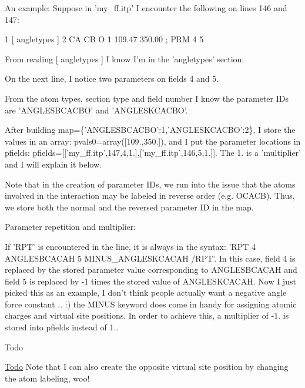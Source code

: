 An example\-: Suppose in 'my\-\_\-ff.\-itp' I encounter the following on lines 146 and 147\-:


\begin{DoxyCode}
1 [ angletypes ]
2 CA   CB   O   1   109.47  350.00  ; PRM 4 5
\end{DoxyCode}


From reading {\ttfamily \mbox{[} angletypes \mbox{]}} I know I'm in the 'angletypes' section.

On the next line, I notice two parameters on fields 4 and 5.

From the atom types, section type and field number I know the parameter I\-Ds are {\ttfamily 'A\-N\-G\-L\-E\-S\-B\-C\-A\-C\-B\-O'} and {\ttfamily 'A\-N\-G\-L\-E\-S\-K\-C\-A\-C\-B\-O'}.

After building {\ttfamily map=\{'A\-N\-G\-L\-E\-S\-B\-C\-A\-C\-B\-O'\-:1,'A\-N\-G\-L\-E\-S\-K\-C\-A\-C\-B\-O'\-:2\}}, I store the values in an array\-: {\ttfamily pvals0=array(\mbox{[}109.,350.\mbox{]})}, and I put the parameter locations in pfields\-: {\ttfamily pfields=\mbox{[}\mbox{[}'my\-\_\-ff.\-itp',147,4,1.\mbox{]},\mbox{[}'my\-\_\-ff.\-itp',146,5,1.\mbox{]}\mbox{]}}. The 1. is a 'multiplier' and I will explain it below.

Note that in the creation of parameter I\-Ds, we run into the issue that the atoms involved in the interaction may be labeled in reverse order (e.\-g. {\ttfamily O\-C\-A\-C\-B}). Thus, we store both the normal and the reversed parameter I\-D in the map.

Parameter repetition and multiplier\-:

If {\ttfamily 'R\-P\-T'} is encountered in the line, it is always in the syntax\-: {\ttfamily 'R\-P\-T 4 A\-N\-G\-L\-E\-S\-B\-C\-A\-C\-A\-H 5 M\-I\-N\-U\-S\-\_\-\-A\-N\-G\-L\-E\-S\-K\-C\-A\-C\-A\-H /\-R\-P\-T'}. In this case, field 4 is replaced by the stored parameter value corresponding to {\ttfamily A\-N\-G\-L\-E\-S\-B\-C\-A\-C\-A\-H} and field 5 is replaced by -\/1 times the stored value of {\ttfamily A\-N\-G\-L\-E\-S\-K\-C\-A\-C\-A\-H}. Now I just picked this as an example, I don't think people actually want a negative angle force constant .. \-:) the {\ttfamily M\-I\-N\-U\-S} keyword does come in handy for assigning atomic charges and virtual site positions. In order to achieve this, a multiplier of -\/1. is stored into pfields instead of 1..

\begin{DoxyRefDesc}{Todo}
\item[\hyperlink{todo__todo000011}{Todo}]Note that I can also create the opposite virtual site position by changing the atom labeling, woo!\end{DoxyRefDesc}



